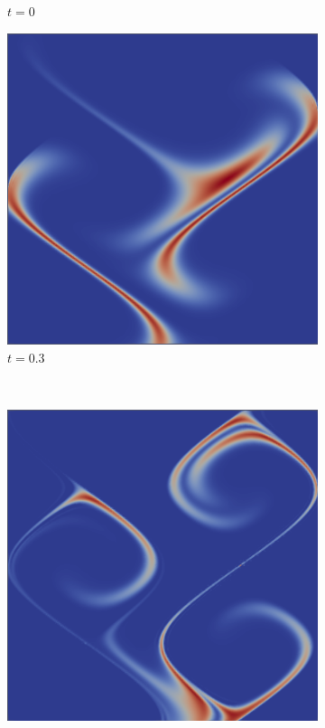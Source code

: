 \documentclass[review]{siamart}
\begin{document}
\begin{figure}[!htb]
\begin{subfigure}[b]{0.3\textwidth}
    \caption{$t = 0$}
  \end{subfigure}
  \begin{subfigure}[b]{0.3\textwidth}
    \includegraphics[width=\textwidth]{./figures/solution.0003.png}
    \caption{$t = 0.3$}
  \end{subfigure}
  \\\vspace{2ex}
   \begin{subfigure}[b]{0.3\textwidth}
    \includegraphics[width=\textwidth]{./figures/solution.0008.png}

\end{subfigure}
\end{figure}
\end{document}
